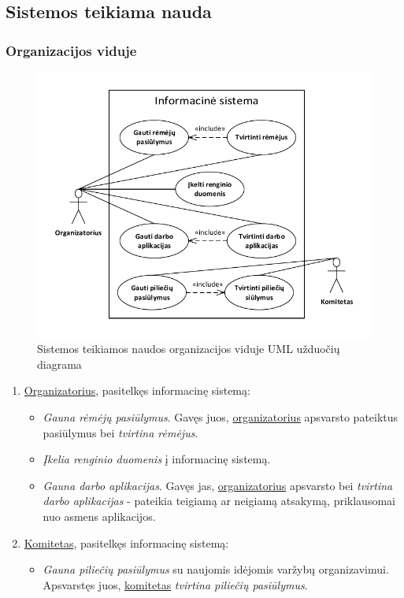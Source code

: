 \documentclass{VUMIFPSkursinis}
\begin{document}
  \subsection{Sistemos teikiama nauda} \label{sistemosNaudojimoScenarijus_nauda}
    \subsubsection*{Organizacijos viduje}
	    \begin{figure}[H]
        \centering
        \includegraphics[width=\textwidth]{img/ScenarijausUzduociuDiagrama1}
        \caption{Sistemos teikiamos naudos organizacijos viduje UML užduočių diagrama}
        \label{fig:scenarijusVidausUzduociuDiagrama}
      \end{figure}

      \begin{enumerate}
        \item \underline{Organizatorius}, pasitelkęs informacinę sistemą:
          \begin{itemize}
            \item \textit{Gauna rėmėjų pasiūlymus}. Gavęs juos, \underline{organizatorius} apsvarsto pateiktus pasiūlymus bei  \textit{tvirtina rėmėjus}.
            \item \textit{Įkelia renginio duomenis} į informacinę sistemą.
            \item \textit{Gauna darbo aplikacijas}. Gavęs jas, \underline{organizatorius} apsvarsto bei  \textit{tvirtina darbo aplikacijas} - pateikia teigiamą ar neigiamą atsakymą, priklausomai nuo asmens aplikacijos.
          \end{itemize}
        \item \underline{Komitetas}, pasitelkęs informacinę sistemą:
          \begin{itemize}
            \item \textit{Gauna piliečių pasiūlymus} su naujomis idėjomis varžybų organizavimui. Apsvarstęs juos, \underline{komitetas} \textit{tvirtina piliečių pasiūlymus}.
          \end{itemize}
      \end{enumerate}
\end{document}
